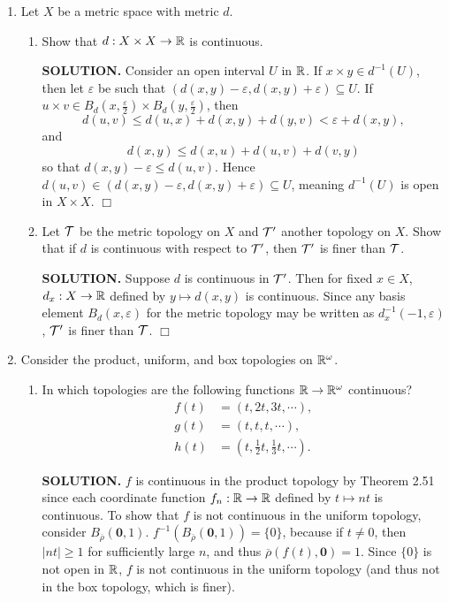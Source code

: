 \documentclass{article}
\begin{document}
\begin{enumerate}
    \item Let $X$ be a metric space with metric $d$.
    \begin{enumerate}
        \item Show that $d: X \times X \rightarrow \mathbb{R}$ is continuous.

        {\bf SOLUTION.} Consider an open interval $U$ in $\mathbb{R}$. If $x \times y \in d^{-1}(U)$, then let $\varepsilon$ be such that $(d(x, y) - \varepsilon, d(x, y) + \varepsilon) \subseteq U.$ If $u \times v \in B_d(x, \frac{\varepsilon}{2}) \times B_d(y, \frac{\varepsilon}{2})$, then 
        $$d(u, v) \leq d(u, x) + d(x, y) + d(y, v) < \varepsilon + d(x, y),$$
        and 
        $$d(x, y) \leq d(x, u) + d(u, v) + d(v, y)$$
        so that $d(x, y) - \varepsilon \leq d(u, v)$. Hence $d(u, v) \in (d(x, y) - \varepsilon, d(x, y) + \varepsilon) \subseteq U$, meaning $d^{-1}(U)$ is open in $X \times X$. $\Box$
        
        \item Let $\mathcal{T}$ be the metric topology on $X$ and $\mathcal{T}'$ another topology on $X$. Show that if $d$ is continuous with respect to $\mathcal{T}'$, then $\mathcal{T}'$ is finer than $\mathcal{T}$.

        {\bf SOLUTION.} Suppose $d$ is continuous in $\mathcal{T}'$. Then for fixed $x \in X$, $d_x: X \rightarrow \mathbb{R}$ defined by $y \mapsto d(x, y)$ is continuous. Since any basis element $B_d(x, \varepsilon)$ for the metric topology may be written as $d_x^{-1}(-1, \varepsilon)$, $\mathcal{T}'$ is finer than $\mathcal{T}$. $\Box$
    \end{enumerate}

    \item Consider the product, uniform, and box topologies on $\mathbb{R}^\omega$.
    \begin{enumerate}
        \item In which topologies are the following functions $\mathbb{R} \rightarrow \mathbb{R}^\omega$ continuous?
        \begin{align*}
            f(t) &= (t, 2t, 3t, \cdots), \\
            g(t) &= (t, t, t, \cdots), \\
            h(t) &= (t, \frac12 t, \frac13t, \cdots).
        \end{align*}

        {\bf SOLUTION.} $f$ is continuous in the product topology by Theorem 2.51 since each coordinate function $f_n: \mathbb{R} \rightarrow \mathbb{R}$ defined by $t \mapsto nt$ is continuous. To show that $f$ is not continuous in the uniform topology, consider $B_{\overline{\rho}}(\mathbf{0}, 1)$. $f^{-1}(B_{\overline{\rho}}(\mathbf{0}, 1)) = \{0\}$, because if $t \neq 0$, then $|nt| \geq 1$ for sufficiently large $n$, and thus $\overline{\rho}(f(t), \mathbf{0}) = 1$. Since $\{0\}$ is not open in $\mathbb{R}$, $f$ is not continuous in the uniform topology (and thus not in the box topology, which is finer).


\end{enumerate}
\end{enumerate}
\end{document}
